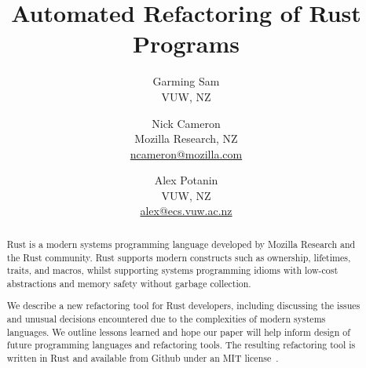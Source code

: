 \documentclass{sig-alternate-05-2015}
\begin{document}
\title{Automated Refactoring of Rust Programs}

\author{Garming Sam\\ VUW, NZ \and Nick Cameron\\ Mozilla Research, NZ\\ \url{ncameron@mozilla.com} \and Alex Potanin\\ VUW, NZ\\ \url{alex@ecs.vuw.ac.nz}}

\maketitle

\begin{abstract}
Rust is a modern systems programming language developed by Mozilla Research and the Rust community. Rust supports modern constructs such as ownership, lifetimes, traits, and macros, whilst supporting systems programming idioms with low-cost abstractions and memory safety without garbage collection.

We describe a new refactoring tool for Rust developers, including discussing the issues and unusual decisions encountered due to the complexities of modern systems languages. We outline lessons learned and hope our paper will help inform design of future programming languages and refactoring tools. The resulting refactoring tool is written in Rust and available from Github under an MIT license~\cite{rrproject}.
\end{abstract}












\end{document}
